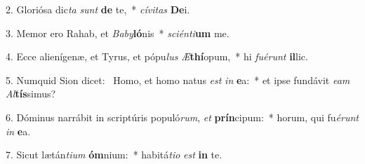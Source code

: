 2. Gloriósa dic\textit{ta} \textit{sunt} \textbf{de} te,~*  \textit{cí}\textit{vi}\textit{tas} \textbf{De}i.\

3. Memor ero Rahab, et \textit{Ba}\textit{by}\textbf{ló}nis~*  \textit{sci}\textit{én}\textit{ti}\textbf{um} me.\

4. Ecce alienígenæ, et Tyrus, et pópu\textit{lus} \textit{Æ}\textbf{thí}opum,~*  hi \textit{fu}\textit{é}\textit{runt} \textbf{il}lic.\

5. Numquid Sion dicet: \dag\  Homo, et homo natus \textit{est} \textit{in} \textbf{e}a:~*  et ipse fundávit \textit{e}\textit{am} \textit{Al}\textbf{tís}simus?\

6. Dóminus narrábit in scriptúris populó\textit{rum}, \textit{et} \textbf{prín}cipum:~*  horum, qui fu\textit{é}\textit{runt} \textit{in} \textbf{e}a.\

7. Sicut lætán\textit{ti}\textit{um} \textbf{óm}nium:~*  habitá\textit{ti}\textit{o} \textit{est} \textbf{in} te.\


